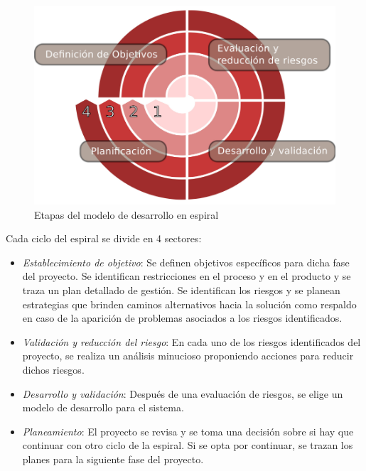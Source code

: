\begin{figure}[h!]
 \begin{center}
  \includegraphics[width=1\textwidth,keepaspectratio=true]{./images/espiral.pdf}
  \caption{Etapas del modelo de desarrollo en espiral}
  \label{fig:esquema}
 \end{center}
\end{figure}

Cada ciclo del espiral se divide en 4 sectores:
\begin {itemize}
\item \textit{Establecimiento de objetivo}: Se definen objetivos
  específicos para dicha fase del proyecto. Se identifican
  restricciones en el proceso y en el producto y se traza un plan
  detallado de gestión. Se identifican los riesgos y se planean
  estrategias que brinden caminos alternativos hacia la solución como
  respaldo en caso de la aparición de problemas asociados a los
  riesgos identificados.
\item \textit{Validación y reducción del riesgo}: En cada uno de los
  riesgos identificados del proyecto, se realiza un análisis
  minucioso proponiendo acciones para reducir dichos riesgos.
\item \textit{Desarrollo y validación}: Después de una evaluación de
  riesgos, se elige un modelo de desarrollo para el sistema.
\item \textit{Planeamiento}: El proyecto se revisa y se toma una
  decisión sobre si hay que continuar con otro ciclo de la espiral. Si
  se opta por continuar, se trazan los planes para la siguiente fase
  del proyecto.
\end {itemize}

